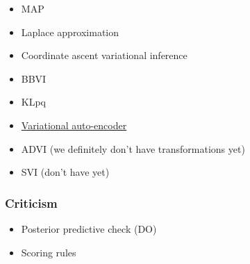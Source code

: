 \begin{itemize}
  \item MAP
  \item Laplace approximation
  \item Coordinate ascent variational inference
  \item BBVI
  \item KLpq
  \item
  \href{https://github.com/blei-lab/edward/blob/master/examples/convolutional_vae.py}{Variational
  auto-encoder}
  \item ADVI (we definitely don't have transformations yet)
  \item SVI (don't have yet)
\end{itemize}

\subsubsection{Criticism}

\begin{itemize}
  \item Posterior predictive check (DO)
  \item Scoring rules
\end{itemize}
